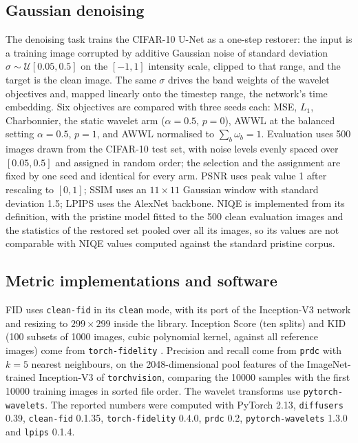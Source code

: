 \subsection{Gaussian denoising}
\label{app:setup-restoration}

The denoising task trains the CIFAR-10 U-Net as a one-step restorer: the input
is a training image corrupted by additive Gaussian noise of standard
deviation $\sigma \sim \mathcal{U}[0.05, 0.5]$ on the $[-1,1]$ intensity
scale, clipped to that range, and the target is the clean image. The same
$\sigma$ drives the band weights of the wavelet objectives and, mapped
linearly onto the timestep range, the network's time embedding. Six objectives
are compared with three seeds each: MSE, $L_1$, Charbonnier, the static
wavelet arm ($\alpha = 0.5$, $p = 0$), AWWL at the balanced setting $\alpha = 0.5$,
$p = 1$, and AWWL normalised to $\sum_b \omega_b = 1$. Evaluation uses 500
images drawn from the CIFAR-10 test set, with noise levels evenly spaced over
$[0.05, 0.5]$ and assigned in random order; the selection and the assignment
are fixed by one seed and identical for every arm. PSNR uses peak value 1
after rescaling to $[0,1]$; SSIM
\citep{wang2004image} uses an $11\times11$ Gaussian window with standard
deviation 1.5; LPIPS \citep{zhang2018unreasonable} uses the AlexNet backbone.
NIQE \citep{mittal2013making} is implemented from its definition, with the
pristine model fitted to the 500 clean evaluation images and the statistics of
the restored set pooled over all its images, so its values are not comparable
with NIQE values computed against the standard pristine corpus.

\subsection{Metric implementations and software}
\label{app:setup-metrics}

FID uses \texttt{clean-fid} in its \texttt{clean} mode, with its port of the
Inception-V3 network \citep{szegedy2016rethinking} and resizing to
$299\times299$ inside the library. Inception Score (ten splits) and KID (100
subsets of \num{1000} images, cubic polynomial kernel, against all reference
images) come from \texttt{torch-fidelity} \citep{obukhov2020torchfidelity}.
Precision and recall \citep{kynkaanniemi2019improved} come from
\texttt{prdc} \citep{naeem2020reliable} with $k = 5$ nearest neighbours, on the
2048-dimensional pool features of the ImageNet-trained Inception-V3 of
\texttt{torchvision}, comparing the \num{10000} samples with the first
\num{10000} training images in sorted file order. The wavelet transforms use
\texttt{pytorch-wavelets}. The reported numbers were computed with PyTorch
2.13, \texttt{diffusers} 0.39, \texttt{clean-fid} 0.1.35,
\texttt{torch-fidelity} 0.4.0, \texttt{prdc} 0.2, \texttt{pytorch-wavelets}
1.3.0 and \texttt{lpips} 0.1.4.


